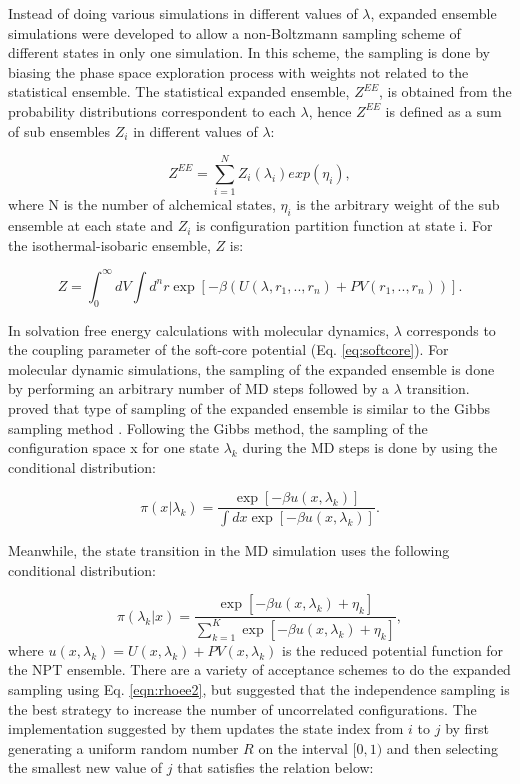 	Instead of doing various simulations in different values of $\lambda$, expanded ensemble simulations \cite{lyubartsev} were developed to allow a non-Boltzmann sampling scheme of different states in only one simulation. In this scheme, the sampling is done by biasing the phase space exploration process with weights not related to the statistical ensemble. The statistical expanded ensemble, $Z^{EE}$, is obtained from the probability distributions correspondent to each $\lambda$, hence $Z^{EE}$ is defined as a sum of sub ensembles $Z_{i}$ in different values of $\lambda$:
	
	\begin{equation}
	Z^{EE} = \sum_{i=1}^{N} Z_{i}(\lambda_{i}) exp(\eta_{i}),
	\label{eqn:ee}
	\end{equation}   
	where N is the number of alchemical states, $\eta_{i}$ is the arbitrary weight of the sub ensemble at each state and $Z_{i}$ is configuration partition function at state i. For the isothermal-isobaric ensemble, $Z$ is:
	
	\begin{equation}
	Z = {\int_{0}^{\infty} dV \int d^{n}r \exp \left[ -\beta \left(U(\lambda, r_{1},..,r_{n}) + PV(r_{1},..,r_{n}) \right) \right]}.
	\end{equation} 
	
	In solvation free energy calculations with molecular dynamics, $\lambda$ corresponds to the coupling parameter of the soft-core potential (Eq. \ref{eq:softcore}). For molecular dynamic simulations, the sampling of the expanded ensemble is done by performing an arbitrary number of MD  steps followed by a $\lambda$ transition.  proved that type of sampling of the expanded ensemble is similar to the Gibbs sampling method \cite{geman1984,liu2002}. Following the Gibbs method, the sampling of the configuration space x for one state $\lambda_{k}$ during the MD steps is done by using the conditional distribution:
	
	\begin{equation}
	\pi(x|\lambda_{k}) = \dfrac{\exp[-\beta u(x,\lambda_{k})]}{\int dx \exp [- \beta u(x,\lambda_{k})]}.
	\label{eqn:rhoee1}
	\end{equation} 
	
	Meanwhile, the state transition in the MD simulation uses the following conditional distribution:
	
	\begin{equation}
	\pi(\lambda_{k}|x) = \dfrac{\exp[-\beta u(x,\lambda_{k}) + \eta_{k}]}{ \sum_{k=1}^{K} \exp [- \beta u(x,\lambda_{k})+ \eta_{k}]},
	\label{eqn:rhoee2}
	\end{equation} 
	where $u(x,\lambda_{k}) = U(x,\lambda_{k}) + PV(x,\lambda_{k})$ is the reduced potential function for the NPT ensemble. There are a variety of acceptance schemes to do the expanded sampling using Eq. \eqref{eqn:rhoee2}, but  suggested that the independence sampling \cite{liu2002} is the best strategy to increase the number of uncorrelated configurations. The implementation suggested by them updates the state index from $i$ to $j$ by first generating a uniform random number $R$ on the interval $[0,1)$ and then selecting the smallest new value of $j$ that satisfies  the relation below:
	
